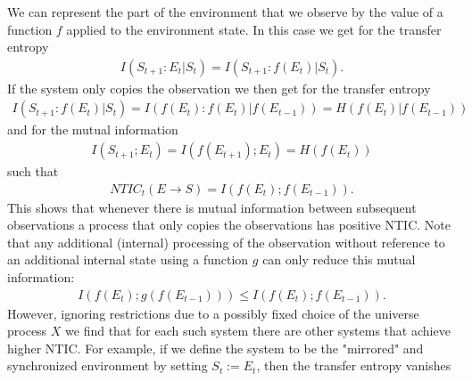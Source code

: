 \documentclass[utf8]{article}
\begin{document}
            
            We can represent the part of the environment that we observe by the value of a function $f$ applied to the environment state. In this case we get for the transfer entropy
            \begin{align}
             I(S_{t+1}:E_t|S_t)=I(S_{t+1}:f(E_t)|S_t).
            \end{align}
            If the system only copies the observation we then get for the transfer entropy
            \begin{align}
             I(S_{t+1}:f(E_t)|S_t)=I(f(E_t):f(E_t)|f(E_{t-1}))=H(f(E_t)|f(E_{t-1}))
            \end{align}
            and for the mutual information
            \begin{align}
             I(S_{t+1};E_t)=I(f(E_{t+1});E_t)=H(f(E_t))
            \end{align}
            such that 
            \begin{align}
                NTIC_t(E\rightarrow S)=I(f(E_t);f(E_{t-1})).
            \end{align}
            This shows that whenever there is mutual information between subsequent observations a process that only copies the observations has positive NTIC. Note that any additional (internal) processing of the observation without reference to an additional internal state using a function $g$ can only reduce this mutual information:
            \begin{align}
               I(f(E_t);g(f(E_{t-1})))\leq I(f(E_t);f(E_{t-1})).
            \end{align}
            However, ignoring restrictions due to a possibly fixed choice of the universe process $X$ we find that for each such system there are other systems that achieve higher NTIC. For example, if we define the system to be the "mirrored" and synchronized environment by setting $S_t:=E_t$, then the transfer entropy vanishes
\end{document}

